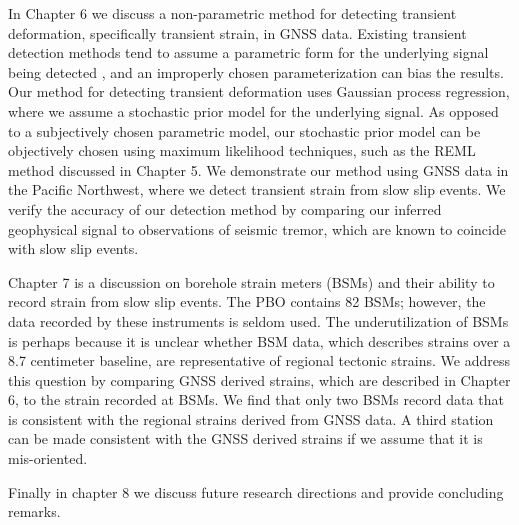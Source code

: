 In Chapter 6 we discuss a non-parametric method for detecting transient deformation, specifically transient strain, in GNSS data. Existing transient detection methods tend to assume a parametric form for the underlying signal being detected \citep[e.g.,][]{Ohtani2010}, and an improperly chosen parameterization can bias the results. Our method for detecting transient deformation uses Gaussian process regression, where we assume a stochastic prior model for the underlying signal. As opposed to a subjectively chosen parametric model, our stochastic prior model can be objectively chosen using maximum likelihood techniques, such as the REML method discussed in Chapter 5. We demonstrate our method using GNSS data in the Pacific Northwest, where we detect transient strain from slow slip events. We verify the accuracy of our detection method by comparing our inferred geophysical signal to observations of seismic tremor, which are known to coincide with slow slip events.       

Chapter 7 is a discussion on borehole strain meters (BSMs) and their ability to record strain from slow slip events. The PBO contains 82 BSMs; however, the data recorded by these instruments is seldom used. The underutilization of BSMs is perhaps because it is unclear whether BSM data, which describes strains over a 8.7 centimeter baseline, are representative of regional tectonic strains. We address this question by comparing GNSS derived strains, which are described in Chapter 6, to the strain recorded at BSMs. We find that only two BSMs record data that is consistent with the regional strains derived from GNSS data. A third station can be made consistent with the GNSS derived strains if we assume that it is mis-oriented.

Finally in chapter 8 we discuss future research directions and provide concluding remarks.                 